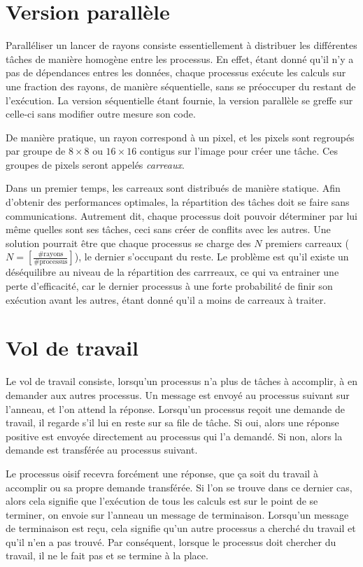 \documentclass[a4paper,11pt]{article}
\begin{document}
\section{Version parallèle}

Paralléliser un lancer de rayons consiste essentiellement à distribuer les différentes tâches de manière homogène entre les processus. En effet, étant donné qu'il n'y  a pas de dépendances entres les données, chaque processus exécute les calculs sur une fraction des rayons, de manière séquentielle, sans se préoccuper du restant de l'exécution. La version séquentielle étant fournie, la version parallèle se greffe sur celle-ci sans modifier outre mesure son code.

De manière pratique, un rayon correspond à un pixel, et les pixels sont regroupés par groupe de $8 \times 8$ ou $16 \times 16$ contigus sur l'image pour créer une tâche. Ces groupes de pixels seront appelés \emph{carreaux}. 

Dans un premier temps, les carreaux sont distribués de manière statique. Afin d'obtenir des performances optimales, la répartition des tâches doit se faire sans communications. Autrement dit, chaque processus doit pouvoir déterminer par lui même quelles sont ses tâches, ceci sans créer de conflits avec les autres. Une solution pourrait être que chaque processus se charge des $N$ premiers carreaux ($N = \left[\frac{\#\mathrm{rayons}}{\#\mathrm{processus}}\right]$), le dernier s'occupant du reste. Le problème est qu'il existe un déséquilibre au niveau de la répartition des carrreaux, ce qui va entrainer une perte d'efficacité, car le dernier processus à une forte probabilité de finir son exécution avant les autres, étant donné qu'il a moins de carreaux à traiter. 




\section{Vol de travail}

Le vol de travail consiste, lorsqu'un processus n'a plus de tâches à accomplir, à en demander aux autres processus. Un message est envoyé au processus suivant sur l'anneau, et l'on attend la réponse. Lorsqu'un processus reçoit une demande de travail, il regarde s'il lui en reste sur sa file de tâche. Si oui, alors une réponse positive est envoyée directement au processus qui l'a demandé. Si non, alors la demande est transférée au processus suivant.

Le processus oisif recevra forcément une réponse, que ça soit du travail à accomplir ou sa propre demande transférée. Si l'on se trouve dans ce dernier cas, alors cela signifie que l'exécution de tous les calculs est sur le point de se terminer, on envoie sur l'anneau un message de terminaison. Lorsqu'un message de terminaison est reçu, cela signifie qu'un autre processus a cherché du travail et qu'il n'en a pas trouvé. Par conséquent, lorsque le processus doit chercher du travail, il ne le fait pas et se termine à la place.
\end{document}
